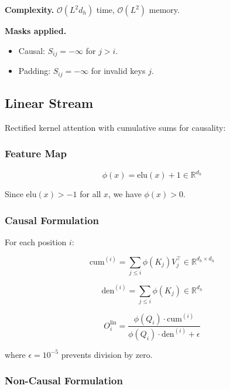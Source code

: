 \textbf{Complexity.} $\mathcal{O}(L^2 d_h)$ time, $\mathcal{O}(L^2)$ memory.

\textbf{Masks applied.}
\begin{itemize}
\item Causal: $S_{ij} = -\infty$ for $j > i$.
\item Padding: $S_{ij} = -\infty$ for invalid keys $j$.

\end{itemize}
\subsection{Linear Stream}

Rectified kernel attention with cumulative sums for causality:

\subsubsection{Feature Map}

\begin{equation}
\phi(x) = \mathrm{elu}(x) + 1 \in \mathbb{R}^{d_h}
\end{equation}

Since $\mathrm{elu}(x) > -1$ for all $x$, we have $\phi(x) > 0$.

\subsubsection{Causal Formulation}

For each position $i$:

\begin{equation}
\text{cum}^{(i)} = \sum_{j \le i} \phi(K_j) V_j^\top \in \mathbb{R}^{d_h \times d_h}
\end{equation}

\begin{equation}
\text{den}^{(i)} = \sum_{j \le i} \phi(K_j) \in \mathbb{R}^{d_h}
\end{equation}

\begin{equation}
O^\text{lin}_i = \frac{\phi(Q_i) \cdot \text{cum}^{(i)}}{\phi(Q_i) \cdot \text{den}^{(i)} + \epsilon}
\end{equation}

where $\epsilon = 10^{-5}$ prevents division by zero.

\subsubsection{Non-Causal Formulation}

